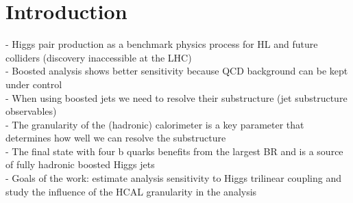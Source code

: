 
\section{Introduction}
\label{sec:intro}

- Higgs pair production as a benchmark physics process for HL and future colliders (discovery inaccessible at the LHC)\\
- Boosted analysis shows better sensitivity because QCD background can be kept under control \\
- When using boosted jets we need to resolve their substructure (jet substructure observables)\\
- The granularity of the (hadronic) calorimeter is a key parameter that determines how well we can resolve the substructure \\
- The final state with four b quarks benefits from the largest BR and is a source of fully hadronic boosted Higgs jets \\
- Goals of the work: estimate analysis sensitivity to Higgs trilinear coupling and study the influence of the HCAL granularity in the analysis
